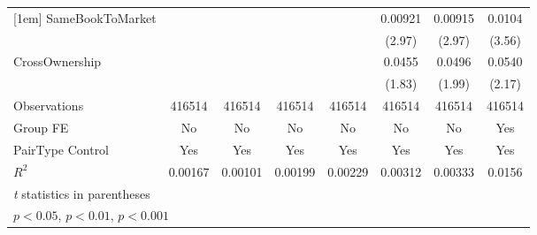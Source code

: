 {\begin{tabular}{l*{7}{c}}
[1em]
SameBookToMarket&                  &                  &                  &                  &  0.00921\sym{**} &  0.00915\sym{**} &   0.0104\sym{***}\\
                &                  &                  &                  &                  &   (2.97)         &   (2.97)         &   (3.56)         \\
[1em]
CrossOwnership  &                  &                  &                  &                  &   0.0455         &   0.0496\sym{*}  &   0.0540\sym{*}  \\
                &                  &                  &                  &                  &   (1.83)         &   (1.99)         &   (2.17)         \\
\hline
Observations    &   416514         &   416514         &   416514         &   416514         &   416514         &   416514         &   416514         \\
Group FE        &       No         &       No         &       No         &       No         &       No         &       No         &      Yes         \\
PairType Control&      Yes         &      Yes         &      Yes         &      Yes         &      Yes         &      Yes         &      Yes         \\
$ R^2 $         &  0.00167         &  0.00101         &  0.00199         &  0.00229         &  0.00312         &  0.00333         &   0.0156         \\
\hline\hline
\multicolumn{8}{l}{\footnotesize \textit{t} statistics in parentheses}\\
\multicolumn{8}{l}{\footnotesize \sym{*} \(p<0.05\), \sym{**} \(p<0.01\), \sym{***} \(p<0.001\)}\\
\end{tabular}
}
